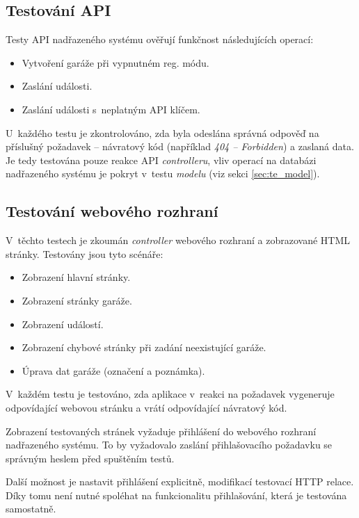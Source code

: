 \subsection{Testování API}

Testy API nadřazeného systému ověřují funkčnost následujících operací:

\begin{itemize}
    \item Vytvoření garáže při vypnutném reg. módu.
    \item Zaslání události.
    \item Zaslání události s~neplatným API klíčem.
\end{itemize}

U~každého testu je zkontrolováno, zda byla odeslána správná odpověď na příslušný požadavek -- návratový kód (například \textit{404 -- Forbidden}) a zaslaná data. Je tedy testována pouze reakce API \textit{controlleru}, vliv operací na databázi nadřazeného systému je pokryt v~testu \textit{modelu} (viz sekci \ref{sec:te_model}).

\subsection{Testování webového rozhraní}

V~těchto testech je zkoumán \textit{controller} webového rozhraní a zobrazované HTML stránky. Testovány jsou tyto scénáře:

\begin{itemize}
    \item Zobrazení hlavní stránky.
    \item Zobrazení stránky garáže.
    \item Zobrazení událostí.
    \item Zobrazení chybové stránky při zadání neexistující garáže.
    \item Úprava dat garáže (označení a poznámka).
\end{itemize}

V~každém testu je testováno, zda aplikace v~reakci na požadavek vygeneruje odpovídající webovou stránku a vrátí odpovídající návratový kód.

Zobrazení testovaných stránek vyžaduje přihlášení do webového rozhraní nadřazeného systému. To by vyžadovalo zaslání přihlašovacího požadavku se správným heslem před spuštěním testů.

Další možnost je nastavit přihlášení explicitně, modifikací testovací HTTP relace. Díky tomu není nutné spoléhat na funkcionalitu přihlašování, která je testována samostatně.

